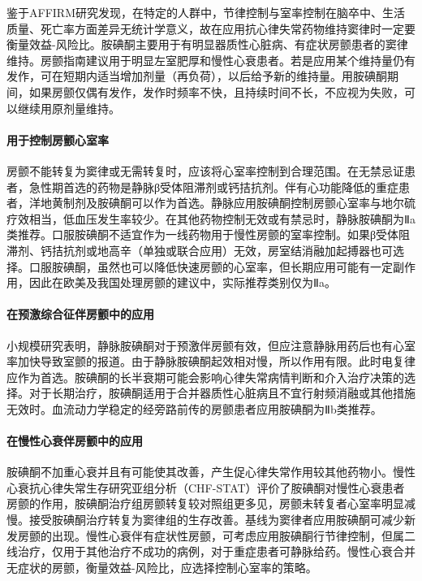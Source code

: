 鉴于AFFIRM研究发现，在特定的人群中，节律控制与室率控制在脑卒中、生活质量、死亡率方面差异无统计学意义，故在应用抗心律失常药物维持窦律时一定要衡量效益-风险比。胺碘酮主要用于有明显器质性心脏病、有症状房颤患者的窦律维持。房颤指南建议用于明显左室肥厚和慢性心衰患者。若是应用某个维持量仍有发作，可在短期内适当增加剂量（再负荷），以后给予新的维持量。用胺碘酮期间，如果房颤仅偶有发作，发作时频率不快，且持续时间不长，不应视为失败，可以继续用原剂量维持。

\paragraph{用于控制房颤心室率}

房颤不能转复为窦律或无需转复时，应该将心室率控制到合理范围。在无禁忌证患者，急性期首选的药物是静脉β受体阻滞剂或钙拮抗剂。伴有心功能降低的重症患者，洋地黄制剂及胺碘酮可以作为首选。静脉应用胺碘酮控制房颤心室率与地尔硫{}
疗效相当，低血压发生率较少。在其他药物控制无效或有禁忌时，静脉胺碘酮为Ⅱa类推荐。口服胺碘酮不适宜作为一线药物用于慢性房颤的室率控制。如果β受体阻滞剂、钙拮抗剂或地高辛（单独或联合应用）无效，房室结消融加起搏器也可选择。口服胺碘酮，虽然也可以降低快速房颤的心室率，但长期应用可能有一定副作用，因此在欧美及我国处理房颤的建议中，实际推荐类别仅为Ⅱa。

\paragraph{在预激综合征伴房颤中的应用}

小规模研究表明，静脉胺碘酮对于预激伴房颤有效，但应注意静脉用药后也有心室率加快导致室颤的报道。由于静脉胺碘酮起效相对慢，所以作用有限。此时电复律应作为首选。胺碘酮的长半衰期可能会影响心律失常病情判断和介入治疗决策的选择。对于长期治疗，胺碘酮适用于合并器质性心脏病且不宜行射频消融或其他措施无效时。血流动力学稳定的经旁路前传的房颤患者应用胺碘酮为Ⅱb类推荐。

\paragraph{在慢性心衰伴房颤中的应用}

胺碘酮不加重心衰并且有可能使其改善，产生促心律失常作用较其他药物小。慢性心衰抗心律失常生存研究亚组分析（CHF-STAT）评价了胺碘酮对慢性心衰患者房颤的作用，胺碘酮治疗组房颤转复较对照组更多见，房颤未转复者心室率明显减慢。接受胺碘酮治疗转复为窦律组的生存改善。基线为窦律者应用胺碘酮可减少新发房颤的出现。慢性心衰伴有症状性房颤，可考虑应用胺碘酮行节律控制，但属二线治疗，仅用于其他治疗不成功的病例，对于重症患者可静脉给药。慢性心衰合并无症状的房颤，衡量效益-风险比，应选择控制心室率的策略。

